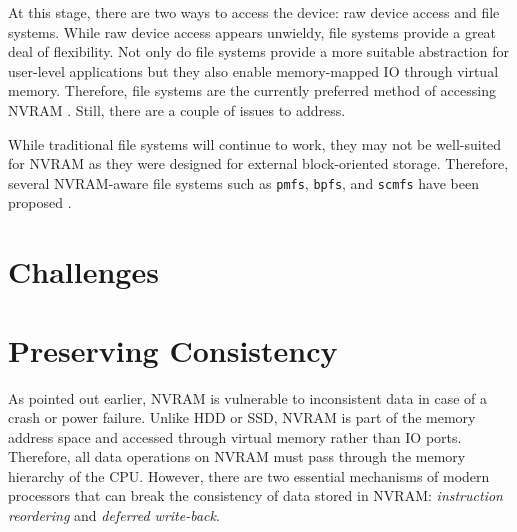 At this stage, there are two ways to access the device: raw device access and
file systems. While raw device access appears unwieldy, file systems provide a
great deal of flexibility. Not only do file systems provide a more suitable
abstraction for user-level applications but they also enable memory-mapped IO
through virtual memory. Therefore, file systems are the currently preferred
method of accessing NVRAM \cite{oukid2017data}. Still, there are a couple
of issues to address.

While traditional file systems will continue to work, they may not be
well-suited for NVRAM as they were designed for external block-oriented
storage. Therefore, several NVRAM-aware file systems such as \texttt{pmfs},
\texttt{bpfs}, and \texttt{scmfs} have been proposed \cite{condit2009better,
wu2011scmfs, dulloor2014system}.



\section{Challenges}


\section{Preserving Consistency}

As pointed out earlier, NVRAM is vulnerable to inconsistent data in case of
a crash or power failure. Unlike HDD or SSD, NVRAM is part of
the memory address space and accessed through virtual memory rather than IO
ports. Therefore, all data operations on NVRAM must pass through the memory
hierarchy of the CPU. However, there are two essential mechanisms of modern
processors that can break the consistency of data stored in NVRAM:
\emph{instruction reordering} and \emph{deferred write-back}.

